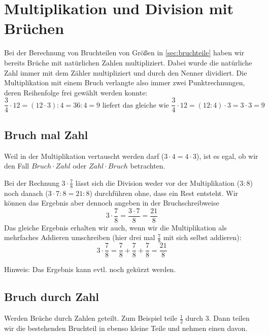 \section{Multiplikation und Division mit Brüchen}\vspace{-1em}
Bei der Berechnung von Bruchteilen von Größen in \autoref{sec:bruchteile} haben wir bereits Brüche mit natürlichen Zahlen multipliziert. Dabei wurde die natürliche Zahl immer mit dem Zähler multipliziert und durch den Nenner dividiert. Die Multiplikation mit einem Bruch verlangte also immer zwei Punktrechnungen, deren Reihenfolge frei gewählt werden konnte:
\begin{equation*}
	\frac{3}{4}\cdot 12 = (12\cdot3) : 4 = 36:4 = 9\text{ liefert das gleiche wie }\frac{3}{4}\cdot 12 = (12:4)\cdot 3 = 3\cdot 3=9
\end{equation*}

\subsection{Bruch mal Zahl}\vspace{-1em}
Weil in der Multiplikation vertauscht werden darf ($3\cdot4=4\cdot3$), ist es egal, ob wir den Fall $Bruch\cdot Zahl$ oder $Zahl\cdot Bruch$ betrachten. 

Bei der Rechnung $3\cdot \frac{7}{8}$ lässt sich die Division weder vor der Multiplikation ($3:8$) noch danach ($3\cdot7:8=21:8$) durchführen ohne, dass ein Rest entsteht. Wir können das Ergebnis aber dennoch angeben in der Bruchschreibweise
\begin{equation*}
	3\cdot \frac{7}{8} = \frac{3\cdot 7}{8}=\frac{21}{8}
\end{equation*}
Das gleiche Ergebnis erhalten wir auch, wenn wir die Multiplikation als mehrfaches Addieren umschreiben (hier drei mal $\frac{7}{8}$ mit sich selbst addieren):
\begin{equation*}
	3\cdot \frac{7}{8} = \frac{7}{8}+\frac{7}{8}+\frac{7}{8}=\frac{21}{8}
\end{equation*}

Hinweis: Das Ergebnis kann evtl. noch gekürzt werden.

\subsection{Bruch durch Zahl}\vspace{-1em}
Werden Brüche durch Zahlen geteilt. Zum Beispiel teile $\frac{1}{2}$ durch $3$. Dann teilen wir die bestehenden Bruchteil in ebenso kleine Teile und nehmen einen davon. 

